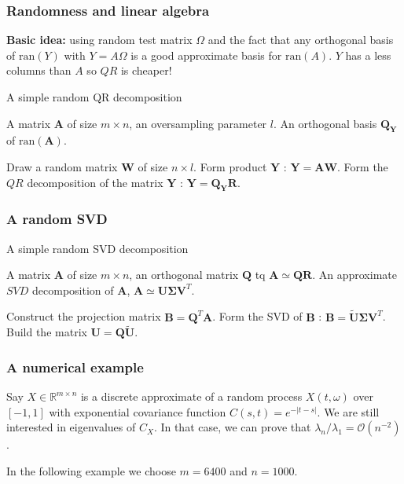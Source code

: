 \begin{frame}
\frametitle{Randomness and linear algebra}
\textbf{Basic idea:} using random test matrix $\Omega$ and the fact that any orthogonal basis of $\mathrm{ran}(Y)$ with $Y=A \Omega$ is a good approximate basis for $\mathrm{ran}(A)$. $Y$ has a less columns than $A$ so $QR$ is cheaper! 

  \begin{algorithm}[H]
  \caption{A simple random QR decomposition}
  \label{rQR}
  \begin{algorithmic}[1]

  \REQUIRE A matrix $\mathbf{A}$ of size $m \times n$, an oversampling parameter $l$.
  \ENSURE An orthogonal basis $\mathbf{Q_Y}$ of $\mathrm{ran}(\mathbf{A})$. 

  \STATE Draw a random matrix $\mathbf{W}$ of size $n \times l$.
  \STATE Form product $\mathbf{Y}$ : $\mathbf{Y} = \mathbf{A} \mathbf{W}$. 
  \STATE Form the $QR$ decomposition of the matrix $\mathbf{Y}$ : $\mathbf{Y}=\mathbf{Q_Y} \mathbf{R}$.
  \RETURN
  \end{algorithmic}
  \end{algorithm}
\end{frame}


\begin{frame}
\frametitle{A random SVD}
  \begin{algorithm}[H]
  \caption{A simple random SVD decomposition}
  \label{rSVD}
  \begin{algorithmic}[2]
  \REQUIRE A matrix $\mathbf{A}$ of size $m \times n$, an orthogonal matrix $\mathbf{Q}$ tq $\mathbf{A} \simeq \mathbf{Q}\mathbf{R}$.
  \ENSURE An approximate $SVD$ decomposition of $\mathbf{A}$, $\mathbf{A} \simeq \mathbf{U} \mathbf{\Sigma} \mathbf{V}^T$.

  \STATE Construct the projection matrix $\mathbf{B}=\mathbf{Q}^T \mathbf{A}$.
  \STATE Form the SVD of $\mathbf{B}$ : $\mathbf{B} = \mathbf{\tilde{U}} \mathbf{\Sigma} \mathbf{V}^T$. 
  \STATE Build the matrix $\mathbf{U} = \mathbf{Q} \mathbf{\tilde{U}}$.

  \RETURN
  \end{algorithmic}
  \end{algorithm}
\end{frame}


\begin{frame}
\frametitle{A numerical example}

Say $X \in \mathbb{R}^{m \times n}$ is a discrete approximate of a random process $X(t,\omega)$ over $[-1,1]$ with exponential covariance function $C(s,t) = e^{-|t-s|}$. We are still interested in eigenvalues of $C_X$. In that case, we can prove that $\lambda_n / \lambda_1 = \mathcal{O}(n^{-2})$.

In the following example we choose $m=6400$ and $n=1000$.
\end{frame}

